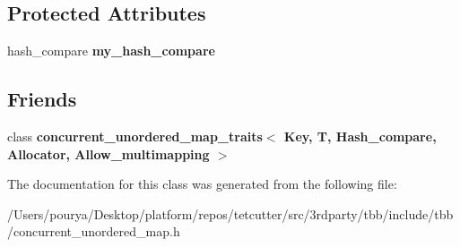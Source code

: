 \subsection*{Protected Attributes}
\begin{DoxyCompactItemize}
\item 
\hypertarget{classtbb_1_1interface5_1_1concurrent__unordered__map__traits_1_1value__compare_a9f3947368607fd396df7f112f79abc1f}{}hash\+\_\+compare {\bfseries my\+\_\+hash\+\_\+compare}\label{classtbb_1_1interface5_1_1concurrent__unordered__map__traits_1_1value__compare_a9f3947368607fd396df7f112f79abc1f}

\end{DoxyCompactItemize}
\subsection*{Friends}
\begin{DoxyCompactItemize}
\item 
\hypertarget{classtbb_1_1interface5_1_1concurrent__unordered__map__traits_1_1value__compare_af8b0853dc699e83103d36df2c881aa67}{}class {\bfseries concurrent\+\_\+unordered\+\_\+map\+\_\+traits$<$ Key, T, Hash\+\_\+compare, Allocator, Allow\+\_\+multimapping $>$}\label{classtbb_1_1interface5_1_1concurrent__unordered__map__traits_1_1value__compare_af8b0853dc699e83103d36df2c881aa67}

\end{DoxyCompactItemize}


The documentation for this class was generated from the following file\+:\begin{DoxyCompactItemize}
\item 
/\+Users/pourya/\+Desktop/platform/repos/tetcutter/src/3rdparty/tbb/include/tbb/concurrent\+\_\+unordered\+\_\+map.\+h\end{DoxyCompactItemize}
